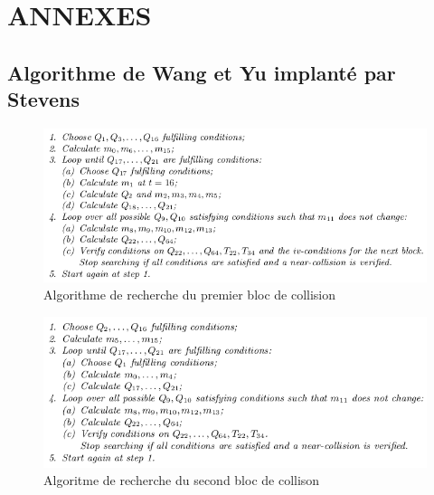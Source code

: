 \documentclass[a4paper,11pt,french]{article}
\begin{document}
\newpage

\section{ANNEXES}
\vspace{1cm}

\subsection{Algorithme de Wang et Yu implanté par Stevens}
\begin{figure}[h!]
  \includegraphics[scale=.61]{./pics/fblock.png}
  \caption{Algorithme de recherche du premier bloc de collision}
\end{figure}

\begin{figure}[h!]
  \includegraphics[scale=.61]{./pics/sblock.png}
  \caption{Algoritme de recherche du second bloc de collison}
\end{figure}

\newpage
\end{document}
